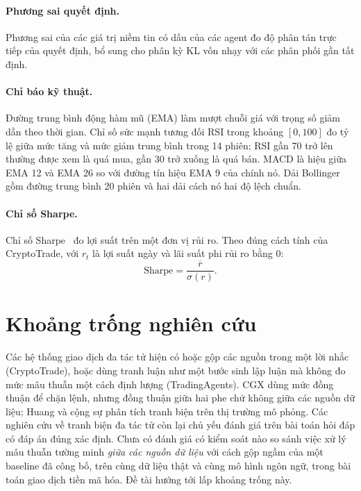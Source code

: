 \paragraph{Phương sai quyết định.} Phương sai của các giá trị niềm tin có dấu của các agent đo độ phân tán trực tiếp của
quyết định, bổ sung cho phân kỳ KL vốn nhạy với các phân phối gần tất định.

\paragraph{Chỉ báo kỹ thuật.} Đường trung bình động hàm mũ (EMA) làm mượt chuỗi giá với trọng số giảm dần theo thời
gian. Chỉ số sức mạnh tương đối RSI trong khoảng $[0,100]$ đo tỷ lệ giữa mức tăng và mức giảm trung bình trong 14 phiên;
RSI gần 70 trở lên thường được xem là quá mua, gần 30 trở xuống là quá bán. MACD là hiệu giữa EMA 12 và EMA 26 so với
đường tín hiệu EMA 9 của chính nó. Dải Bollinger gồm đường trung bình 20 phiên và hai dải cách nó hai độ lệch chuẩn.

\paragraph{Chỉ số Sharpe.} Chỉ số Sharpe~\cite{sharpe1966} đo lợi suất trên một đơn vị rủi ro. Theo đúng cách tính
của CryptoTrade, với $r_t$ là lợi suất ngày và lãi suất phi rủi ro bằng 0:
\begin{equation}
  \text{Sharpe} = \frac{\overline{r}}{\sigma(r)}.
\end{equation}

\section{Khoảng trống nghiên cứu}
Các hệ thống giao dịch đa tác tử hiện có hoặc gộp các nguồn trong một lời nhắc (CryptoTrade), hoặc dùng tranh luận như
một bước sinh lập luận mà không đo mức mâu thuẫn một cách định lượng (TradingAgents). CGX dùng mức đồng thuận để chặn
lệnh, nhưng đồng thuận giữa hai phe chứ không giữa các nguồn dữ liệu; Huang và cộng sự phân tích tranh biện trên thị
trường mô phỏng. Các nghiên cứu về tranh biện đa tác tử còn lại chủ yếu đánh giá trên bài toán hỏi đáp có đáp án đúng
xác định. Chưa có đánh giá có kiểm soát nào so sánh việc xử lý mâu thuẫn tường minh \emph{giữa các nguồn dữ liệu} với
cách gộp ngầm của một baseline đã công bố, trên cùng dữ liệu thật và cùng mô hình ngôn ngữ, trong bài toán giao dịch
tiền mã hóa. Đề tài hướng tới lấp khoảng trống này.

